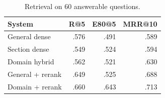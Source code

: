\begin{table}[t]
\centering
\setlength{\tabcolsep}{4pt}
\begin{tabular}{lrrr}
\toprule
System & R@5 & E80@5 & MRR@10 \\
\midrule
General dense & .576 & .491 & .589 \\
Section dense & .549 & .524 & .594 \\
Domain hybrid & .562 & .521 & .630 \\
General + rerank & .649 & .525 & .688 \\
Domain + rerank & .660 & .643 & .713 \\
\bottomrule
\end{tabular}
\caption{Retrieval on 60 answerable questions.}
\end{table}
